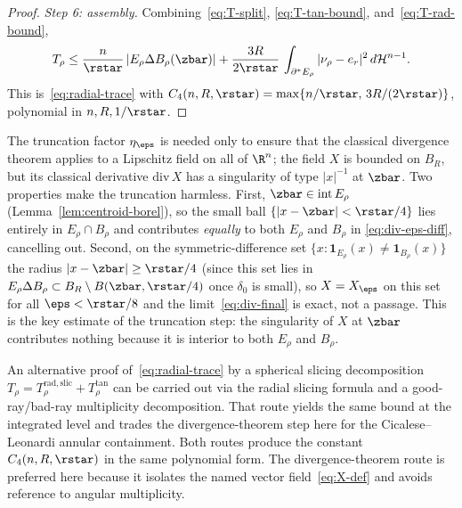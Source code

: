 \begin{proof}
\emph{Step 6: assembly.}
Combining~\eqref{eq:T-split}, \eqref{eq:T-tan-bound},
and~\eqref{eq:T-rad-bound},
\begin{equation}\label{eq:T-trace-explicit}
   T_\rho
   \le\frac{n}{\rstar}\,|E_\rho\Delta B_\rho(\zbar)|
   +\frac{3R}{2\rstar}\,
     \int_{\partial^*E_\rho}|\nu_\rho-e_r|^2\,d\mathcal H^{n-1}.
\end{equation}
This is~\eqref{eq:radial-trace} with
$C_4(n,R,\rstar)=\max\{n/\rstar,\,3R/(2\rstar)\}$, polynomial in $n,R,1/\rstar$.
\end{proof}

\begin{remark}\label{rmk:truncation}
The truncation factor $\eta_\eps$ is needed only to ensure that the
classical divergence theorem applies to a Lipschitz field on all of
$\R^n$; the field $X$ is bounded on $B_R$, but its classical derivative
$\mathrm{div}\,X$ has a singularity of type $|x|^{-1}$ at $\zbar$. Two
properties make the truncation harmless. First,
$\zbar\in\mathrm{int}\,E_\rho$ (Lemma~\ref{lem:centroid-borel}), so the
small ball $\{|x-\zbar|<\rstar/4\}$ lies entirely in $E_\rho\cap B_\rho$
and contributes \emph{equally} to both $E_\rho$ and $B_\rho$ in
\eqref{eq:div-eps-diff}, cancelling out. Second, on the
symmetric-difference set $\{x:\mathbf1_{E_\rho}(x)\ne\mathbf1_{B_\rho}(x)\}$
the radius $|x-\zbar|\ge\rstar/4$ (since this set lies in
$E_\rho\Delta B_\rho\subset B_R\setminus B(\zbar,\rstar/4)$ once
$\delta_0$ is small), so $X=X_\eps$ on this set for all $\eps<\rstar/8$
and the limit~\eqref{eq:div-final} is exact, not a passage. This is the
key estimate of the truncation step: the singularity of $X$ at $\zbar$
contributes nothing because it is interior to both $E_\rho$ and $B_\rho$.
\end{remark}

\begin{remark}\label{rmk:slicing-route}
An alternative proof of~\eqref{eq:radial-trace} by a spherical slicing
decomposition $T_\rho=T_\rho^{\mathrm{rad,slic}}+T_\rho^{\mathrm{tan}}$
can be carried out via the radial slicing formula
\cite[Thm.\ 18.11]{Maggi2012} and a good-ray/bad-ray multiplicity
decomposition. That route yields the same bound at the integrated level
and trades the divergence-theorem step here for the Cicalese--Leonardi
annular containment. Both routes produce the constant $C_4(n,R,\rstar)$
in the same polynomial form. The divergence-theorem route is preferred
here because it isolates the named vector field~\eqref{eq:X-def} and
avoids reference to angular multiplicity.
\end{remark}


